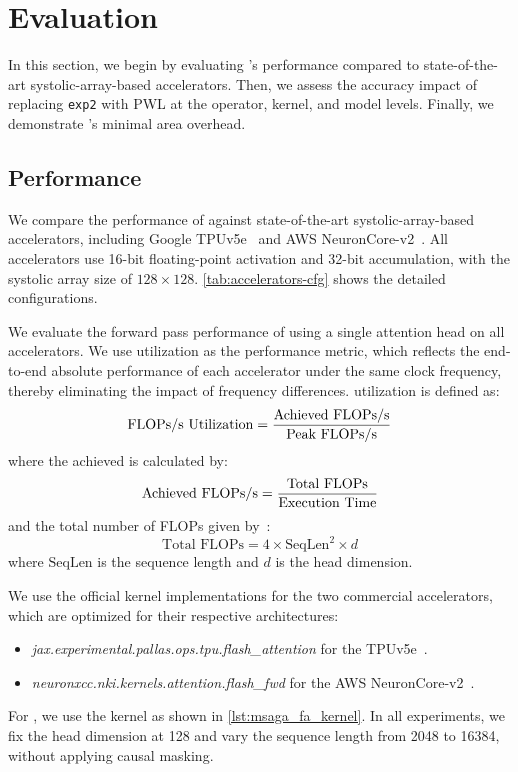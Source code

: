 \section{Evaluation}

In this section,
we begin by evaluating \MSAGA{}'s performance compared to state-of-the-art systolic-array-based accelerators.
Then, we assess the accuracy impact of replacing \texttt{exp2} with PWL at the operator, kernel, and model levels.
Finally, we demonstrate \MSAGA{}'s minimal area overhead.

\subsection{\MSAGA{} Performance}\label{sec:eval-performance}

We compare the \FA{} performance of \MSAGA{} against state-of-the-art
systolic-array-based accelerators, 
including Google TPUv5e~\cite{gcp_tpuv5e} and AWS NeuronCore-v2~\cite{neuroncore-v2-arch}.
All accelerators use 16-bit floating-point activation 
and 32-bit accumulation, with the systolic array size of $128 \times 128$. 
\autoref{tab:accelerators-cfg} shows the detailed configurations.

We evaluate the forward pass performance of \FA{} using a single attention head 
on all accelerators. We use \FLOPs{} utilization as the performance metric, 
which reflects the end-to-end absolute performance of each accelerator 
under the same clock frequency, thereby eliminating the impact of 
frequency differences.
\FLOPs{} utilization is defined as:
\[
\text{FLOPs/s{} Utilization} = 
\frac{\text{Achieved FLOPs/s{}}}{\text{Peak FLOPs/s{}}}
\]
where the achieved \FLOPs{} is calculated by:
\[
\text{Achieved FLOPs/s{}} = 
\frac{\text{Total FLOPs}}{\text{Execution Time}}
\]
and the total number of FLOPs given by~\cite{fa2}:
\[
\text{Total FLOPs} = 4 \times \text{SeqLen}^2 \times d
\]
where $\text{SeqLen}$ is the sequence length and $d$ is the head dimension.

We use the official \FA{} kernel implementations for the two commercial 
accelerators, which are optimized for their respective architectures:
\begin{itemize}
  \item \textit{jax.experimental.pallas.ops.tpu.flash\_attention} for the TPUv5e~\cite{jax_pallas_tpu}.
  \item \textit{neuronxcc.nki.kernels.attention.flash\_fwd} for the AWS NeuronCore-v2~\cite{aws_neuron_nki}.
\end{itemize}
For \MSAGA{}, we use the \SA{} kernel as shown in \autoref{lst:msaga_fa_kernel}. 
In all experiments, we fix the head dimension at 128 and vary the sequence 
length from 2048 to 16384, without applying causal masking.


